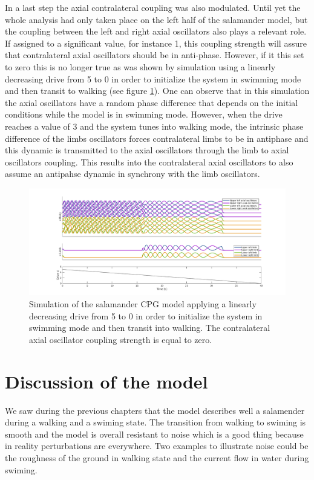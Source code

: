 \documentclass[a4paper]{scrartcl}
\begin{document}
In a last step the axial contralateral coupling was also modulated. Until yet the whole analysis had \newpage only taken place on the left half of the salamander model, but the coupling between the left and right axial oscillators also plays a relevant role. If assigned to a significant value, for instance 1, this coupling strength will assure that contralateral axial oscillators should be in anti-phase. However, if it this set to zero this is no longer true as was shown by simulation using a linearly decreasing drive from 5 to 0 in order to initialize the system in swimming mode and then transit to walking (see figure \ref{fig:7c-leftright}). One can observe that in this simulation the axial oscillators have a random phase difference that depends on the initial conditions while the model is in swimming mode. However, when the drive reaches a value of 3 and the system tunes into walking mode, the intrinsic phase difference of the limbs oscillators forces contralateral limbs to be in antiphase and this dynamic is transmitted to the axial oscillators through the limb to axial oscillators coupling. This results into the contralateral axial oscillators to also assume an antipahse dynamic in synchrony with the limb oscillators.

\begin{figure}[!b]
	\includegraphics[width=\textwidth]{fig/figure7c_left-right-coupling.png}
	\caption{Simulation of the salamander CPG model applying a linearly decreasing drive from 5 to 0 in order to initialize the system in swimming mode and then transit into walking. The contralateral axial oscillator coupling strength is equal to zero.}
	\label{fig:7c-leftright}
\end{figure}

\section{Discussion of the model}

We saw during the previous chapters that the model describes well a salamender during a walking and a swiming state. The transition from walking to swiming is smooth and the model is overall resistant to noise which is a good thing because in reality perturbations are everywhere. Two examples to illustrate noise could be the roughness of the ground in walking state and the current flow in water during swiming. 
\end{document}
